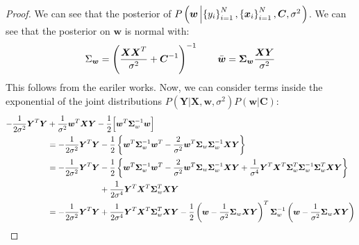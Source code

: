 \begin{proof}
    We can see that the posterior of $P\left( \boldsymbol w \left| \left\{ y_i \right\}^N_{i=1}, \left\{ \boldsymbol x_i \right\}^N_{i=1}, \boldsymbol C,\sigma^2\right. \right)$. We can see that the posterior on $\boldsymbol w$ is normal with:
    \begin{equation*}
        \Sigma_{\boldsymbol w} = \left( \frac{\boldsymbol X\boldsymbol X^T}{\sigma^2} + \boldsymbol C^{-1} \right)^{-1} \qquad \bar{\boldsymbol w} = \boldsymbol \Sigma_{\boldsymbol w}\frac{\boldsymbol X\boldsymbol Y}{\sigma^2}
    \end{equation*}
    This follows from the eariler works. Now, we can consider terms inside the exponential of the joint distributions $P(\boldsymbol Y | \boldsymbol X, \boldsymbol w, \sigma^2)P(\boldsymbol w | \boldsymbol C)$:
    \begin{equation*}
    \begin{aligned}
        -\frac{1}{2\sigma^2}\boldsymbol Y^T\boldsymbol Y &+ \frac{1}{\sigma^2}\boldsymbol w^T\boldsymbol X\boldsymbol Y - \frac{1}{2}\Big[ \boldsymbol w^T\boldsymbol \Sigma_w^{-1}\boldsymbol w \Big] \\
        &=-\frac{1}{2\sigma^2}\boldsymbol Y^T\boldsymbol Y - \frac{1}{2}\brackc{\boldsymbol w^T\boldsymbol \Sigma^{-1}_w\boldsymbol w^T - \frac{2}{\sigma^2}\boldsymbol w^T\boldsymbol \Sigma_w\boldsymbol \Sigma^{-1}_w\boldsymbol X\boldsymbol Y} \\
        &=\begin{aligned}[t]
            -\frac{1}{2\sigma^2}\boldsymbol Y^T\boldsymbol Y &- \frac{1}{2}\brackc{\boldsymbol w^T\boldsymbol \Sigma^{-1}_w\boldsymbol w^T - \frac{2}{\sigma^2}\boldsymbol w^T\boldsymbol \Sigma_w\boldsymbol \Sigma^{-1}_w\boldsymbol X\boldsymbol Y + \frac{1}{\sigma^4}\boldsymbol Y^T\boldsymbol X^T\boldsymbol \Sigma^T_w\boldsymbol \Sigma^{-1}_w\boldsymbol \Sigma^T_w\boldsymbol X\boldsymbol Y} \\
            &+ \frac{1}{2\sigma^4}\boldsymbol Y^T\boldsymbol X^T\boldsymbol \Sigma^T_w\boldsymbol X\boldsymbol Y
        \end{aligned} \\
        &= -\frac{1}{2\sigma^2}\boldsymbol Y^T\boldsymbol Y + \frac{1}{2\sigma^4}\boldsymbol Y^T\boldsymbol X^T\boldsymbol \Sigma^T_w\boldsymbol X\boldsymbol Y -\frac{1}{2}\bracka{\boldsymbol w - \frac{1}{\sigma^2}\boldsymbol \Sigma_w\boldsymbol X\boldsymbol Y}^T\boldsymbol \Sigma^{-1}_w\bracka{\boldsymbol w - \frac{1}{\sigma^2}\boldsymbol \Sigma_w\boldsymbol X\boldsymbol Y}
    \end{aligned}

\end{equation*}
\end{proof}

